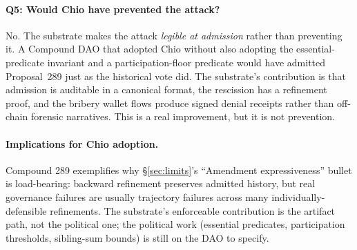 \paragraph{Q5: Would Chio have prevented the attack?}
No. The substrate makes the attack \emph{legible at admission} rather than preventing it. A Compound DAO that adopted Chio without also adopting the essential-predicate invariant and a participation-floor predicate would have admitted Proposal~289 just as the historical vote did. The substrate's contribution is that admission is auditable in a canonical format, the rescission has a refinement proof, and the bribery wallet flows produce signed denial receipts rather than off-chain forensic narratives. This is a real improvement, but it is not prevention.

\paragraph{Implications for Chio adoption.}
Compound 289 exemplifies why \S\ref{sec:limits}'s ``Amendment expressiveness'' bullet is load-bearing: backward refinement preserves admitted history, but real governance failures are usually trajectory failures across many individually-defensible refinements. The substrate's enforceable contribution is the artifact path, not the political one; the political work (essential predicates, participation thresholds, sibling-sum bounds) is still on the DAO to specify.
